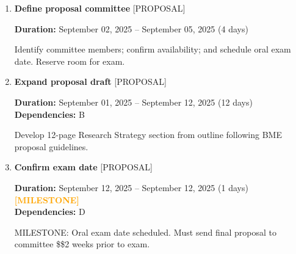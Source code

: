 \documentclass[landscape,a4paper]{article}
\begin{document}
\begin{enumerate}[leftmargin=1.5cm, itemsep=1em, parsep=0.5em]
    \item \textcolor{researchcore}{\textbf{\large Define proposal committee}}
          \hfill \textcolor{black!60}{\small [PROPOSAL]}
          
          \vspace{0.2em}
          \textcolor{black!70}{\textbf{Duration:} September 02, 2025 -- September 05, 2025 (4 days)}

          \vspace{0.4em}
          \begin{minipage}[t]{0.9\textwidth}
          \textcolor{black!85}{Identify committee members; confirm availability; and schedule oral exam date. Reserve room for exam.}
          \end{minipage}

    \item \textcolor{researchcore}{\textbf{\large Expand proposal draft}}
          \hfill \textcolor{black!60}{\small [PROPOSAL]}
          
          \vspace{0.2em}
          \textcolor{black!70}{\textbf{Duration:} September 01, 2025 -- September 12, 2025 (12 days)}
          \\[0.2em]\textcolor{black!70}{\textbf{Dependencies:} B}\n
          \vspace{0.4em}
          \begin{minipage}[t]{0.9\textwidth}
          \textcolor{black!85}{Develop 12-page Research Strategy section from outline following BME proposal guidelines.}
          \end{minipage}

    \item \textcolor{researchcore}{\textbf{\large Confirm exam date}}
          \hfill \textcolor{black!60}{\small [PROPOSAL]}
          
          \vspace{0.2em}
          \textcolor{black!70}{\textbf{Duration:} September 12, 2025 -- September 12, 2025 (1 days)}
          \textcolor{orange}{\textbf{ [MILESTONE]}}\n          \\[0.2em]\textcolor{black!70}{\textbf{Dependencies:} D}\n
          \vspace{0.4em}
          \begin{minipage}[t]{0.9\textwidth}
          \textcolor{black!85}{MILESTONE: Oral exam date scheduled. Must send final proposal to committee \$\geq\$2 weeks prior to exam.}
          \end{minipage}


\end{enumerate}
\end{document}
